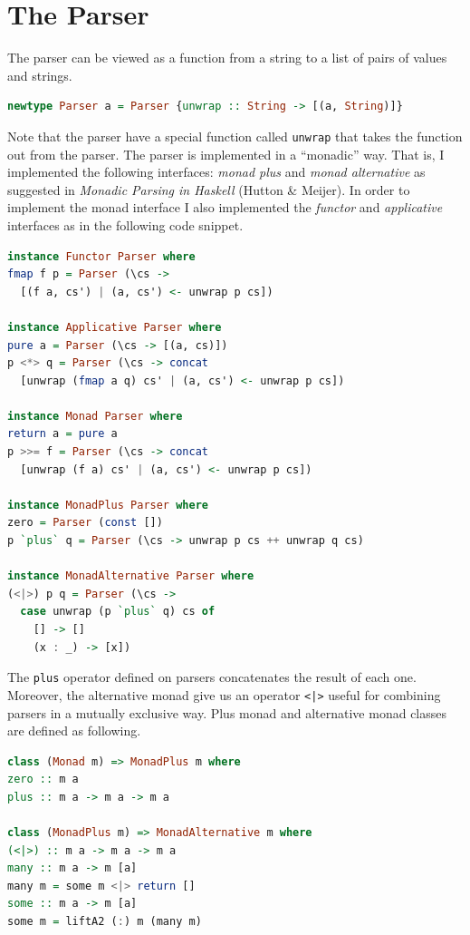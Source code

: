 \documentclass[12pt,a4paper]{article}
\begin{document}
\section*{The Parser}
The parser can be viewed as a function from a string to a list of pairs of values and strings.
\begin{lstlisting}[language=Haskell, style=custom-style]
newtype Parser a = Parser {unwrap :: String -> [(a, String)]}
\end{lstlisting}
Note that the parser have a special function called \texttt{unwrap} that takes the function out from the parser.
The parser is implemented in a ``monadic'' way.
That is, I implemented the following interfaces: \textit{monad plus} and \textit{monad alternative} as suggested in \textit{Monadic Parsing in Haskell} (Hutton \& Meijer).
In order to implement the monad interface I also implemented the \textit{functor} and \textit{applicative} interfaces as in the following code snippet.
\begin{lstlisting}[language=Haskell, style=custom-style]
instance Functor Parser where
fmap f p = Parser (\cs ->
  [(f a, cs') | (a, cs') <- unwrap p cs])

instance Applicative Parser where
pure a = Parser (\cs -> [(a, cs)])
p <*> q = Parser (\cs -> concat
  [unwrap (fmap a q) cs' | (a, cs') <- unwrap p cs])

instance Monad Parser where
return a = pure a
p >>= f = Parser (\cs -> concat
  [unwrap (f a) cs' | (a, cs') <- unwrap p cs])

instance MonadPlus Parser where
zero = Parser (const [])
p `plus` q = Parser (\cs -> unwrap p cs ++ unwrap q cs)

instance MonadAlternative Parser where
(<|>) p q = Parser (\cs ->
  case unwrap (p `plus` q) cs of
    [] -> []
    (x : _) -> [x])
\end{lstlisting}
The \texttt{plus} operator defined on parsers concatenates the result of each one.
Moreover, the alternative monad give us an operator \texttt{<|>} useful for combining parsers in a mutually exclusive way.
Plus monad and alternative monad classes are defined as following.
\begin{lstlisting}[language=Haskell, style=custom-style]
class (Monad m) => MonadPlus m where
zero :: m a
plus :: m a -> m a -> m a

class (MonadPlus m) => MonadAlternative m where
(<|>) :: m a -> m a -> m a
many :: m a -> m [a]
many m = some m <|> return []
some :: m a -> m [a]
some m = liftA2 (:) m (many m)
\end{lstlisting}
\end{document}
